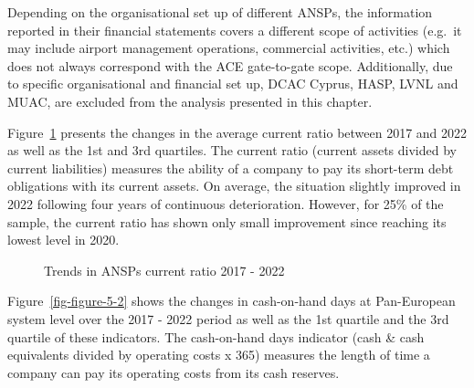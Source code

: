 \documentclass[
  letterpaper,
  DIV=11,
  numbers=noendperiod]{scrreprt}
\begin{document}
Depending on the organisational set up of different ANSPs, the
information reported in their financial statements covers a different
scope of activities (e.g.~it may include airport management operations,
commercial activities, etc.) which does not always correspond with the
ACE gate-to-gate scope. Additionally, due to specific organisational and
financial set up, DCAC Cyprus, HASP, LVNL and MUAC, are excluded from
the analysis presented in this chapter.

Figure~\ref{fig-figure-5-1} presents the changes in the average current
ratio between 2017 and 2022 as well as the 1st and 3rd quartiles. The
current ratio (current assets divided by current liabilities) measures
the ability of a company to pay its short-term debt obligations with its
current assets. On average, the situation slightly improved in 2022
following four years of continuous deterioration. However, for 25\% of
the sample, the current ratio has shown only small improvement since
reaching its lowest level in 2020.

\begin{figure}


\caption{\label{fig-figure-5-1}Trends in ANSPs current ratio 2017 -
2022}

\end{figure}%

Figure~\ref{fig-figure-5-2} shows the changes in cash-on-hand days at
Pan-European system level over the 2017 - 2022 period as well as the 1st
quartile and the 3rd quartile of these indicators. The cash-on-hand days
indicator (cash \& cash equivalents divided by operating costs x 365)
measures the length of time a company can pay its operating costs from
its cash reserves.
\end{document}

